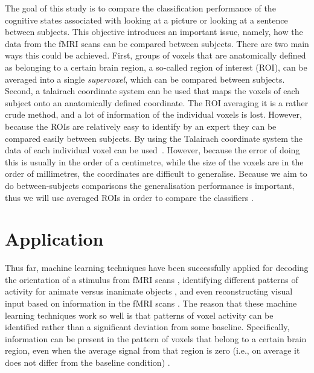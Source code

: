 \documentclass[preprint,journal,11pt]{vgtc}
\begin{document}
\indent The goal of this study is to compare the classification performance of the cognitive states associated with looking at a picture or looking at a sentence between subjects. This objective introduces an important issue, namely, how the data from the fMRI scans can be compared between subjects. There are two main ways this could be achieved. First, groups of voxels that are anatomically defined as belonging to a certain brain region, a so-called region of interest (ROI), can be averaged into a single \emph{supervoxel}, which can be compared between subjects. Second, a talairach coordinate system can be used that maps the voxels of each subject onto an anatomically defined coordinate. The ROI averaging it is a rather crude method, and a lot of information of the individual voxels is lost. However, because the ROIs are relatively easy to identify by an expert they can be compared easily between subjects. By using the Talairach coordinate system the data of each individual voxel can be used~\cite{talairach1988co}. However, because the error of doing this is usually in the order of a centimetre, while the size of the voxels are in the order of millimetres, the coordinates are difficult to generalise. Because we aim to do between-subjects comparisons the generalisation performance is important, thus we will use averaged ROIs in order to compare the classifiers \cite{mi:2004coord}.




\section{Application}
\label{sec:application}
Thus far, machine learning techniques have been successfully applied for decoding the orientation of a stimulus from fMRI scans \cite{ka:2005decoding}, identifying different patterns of activity for animate versus inanimate objects \cite{kr:2008RSA}, and even reconstructing visual input based on information in the fMRI scans \cite{mi:2008re}. The reason that these machine learning techniques work so well is that patterns of voxel activity can be identified rather than a significant deviation from some baseline. Specifically, information can be present in the pattern of voxels that belong to a certain brain region, even when the average signal from that region is zero (i.e., on average it does not differ from the baseline condition) \cite{to:2012rev}.
\end{document}
